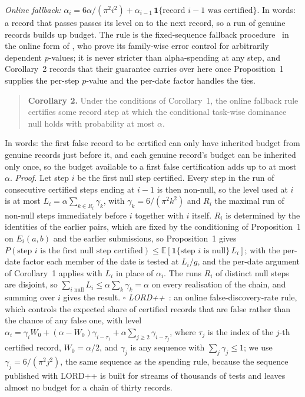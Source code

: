 \documentclass[11pt]{article}
\newcommand{\E}{\mathbb{E}}
\begin{document}
\emph{Online fallback:} $\alpha_i=6\alpha/(\pi^2i^2)+\alpha_{i-1}\,\mathbf 1\{\text{record } i-1\text{ was certified}\}$.
In words: a record that passes passes its level on to the next record, so a run of genuine records builds up budget.
The rule is the fixed-sequence fallback procedure~\citep{wiens2003fallback} in the online form of \citet{tian2021onlinefwer}, who prove its family-wise error control for arbitrarily dependent $p$-values; it is never stricter than alpha-spending at any step, and Corollary~2 records that their guarantee carries over here once Proposition~1 supplies the per-step $p$-value and the per-date factor handles the ties.

\begin{quote}
\textbf{Corollary 2.}
Under the conditions of Corollary~1, the online fallback rule certifies some record step at which the conditional task-wise dominance null holds with probability at most $\alpha$.
\end{quote}
In words: the first false record to be certified can only have inherited budget from genuine records just before it, and each genuine record's budget can be inherited only once, so the budget available to a first false certification adds up to at most $\alpha$.
\emph{Proof.}
Let step $i$ be the first null step certified.
Every step in the run of consecutive certified steps ending at $i-1$ is then non-null, so the level used at $i$ is at most $L_i=\alpha\sum_{k\in R_i}\gamma_k$, with $\gamma_k=6/(\pi^2k^2)$ and $R_i$ the maximal run of non-null steps immediately before $i$ together with $i$ itself.
$R_i$ is determined by the identities of the earlier pairs, which are fixed by the conditioning of Proposition~1 on $E_i(a,b)$ and the earlier submissions, so Proposition~1 gives $P(\text{step } i\text{ is the first null step certified})\le\E[\mathbf 1\{\text{step } i\text{ is null}\}\,L_i]$; with the per-date factor each member of the date is tested at $L_i/g$, and the per-date argument of Corollary~1 applies with $L_i$ in place of $\alpha_i$.
The runs $R_i$ of distinct null steps are disjoint, so $\sum_{i\text{ null}}L_i\le\alpha\sum_k\gamma_k=\alpha$ on every realisation of the chain, and summing over $i$ gives the result. $\square$
\emph{LORD++}~\citep{ramdas2017lord}: an online false-discovery-rate rule, which controls the expected share of certified records that are false rather than the chance of any false one, with level $\alpha_i=\gamma_i W_0+(\alpha-W_0)\gamma_{i-\tau_1}+\alpha\sum_{j\ge2}\gamma_{i-\tau_j}$, where $\tau_j$ is the index of the $j$-th certified record, $W_0=\alpha/2$, and $\gamma_j$ is any sequence with $\sum_j\gamma_j\le1$; we use $\gamma_j=6/(\pi^2 j^2)$, the same sequence as the spending rule, because the sequence published with LORD++ is built for streams of thousands of tests and leaves almost no budget for a chain of thirty records.
\end{document}
